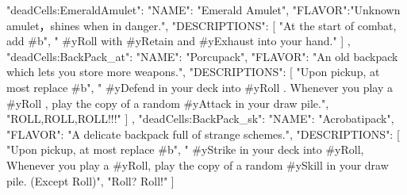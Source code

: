{  "deadCells:EmeraldAmulet": {
    "NAME": "Emerald Amulet",
    "FLAVOR":"Unknown amulet，shines when in danger.",
    "DESCRIPTIONS": [
      "At the start of combat, add #b",
      " #yRoll with #yRetain and #yExhaust into your hand."
    ]
  },
  "deadCells:BackPack_at": {
    "NAME": "Porcupack",
    "FLAVOR": "An old backpack which lets you store more weapons.",
    "DESCRIPTIONS": [
      "Upon pickup, at most replace #b",
      " #yDefend in your deck into #yRoll . Whenever you play a #yRoll , play the copy of a random #yAttack in your draw pile.",
      "ROLL,ROLL,ROLL!!!"
    ]
  },
  "deadCells:BackPack_sk": {
    "NAME": "Acrobatipack",
    "FLAVOR": "A delicate backpack full of strange schemes.",
    "DESCRIPTIONS": [
      "Upon pickup, at most replace #b",
      " #yStrike in your deck into #yRoll, Whenever you play a #yRoll, play the copy of a random #ySkill in your draw pile. (Except Roll)",
      "Roll? Roll!"
    ]
  }
}